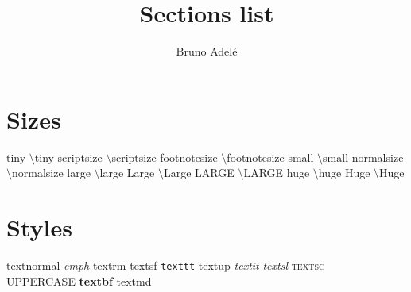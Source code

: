 \documentclass[a4paper, 12pt]{article}
\title{\Huge Sections list}
\author{Bruno Adelé}
\date{}
\newcommand{\showsize}[1]{\csname #1 \endcsname $\setminus$#1}
\begin{document}
\section{Sizes}
\noindent \showsize{tiny}
\showsize{scriptsize}
\showsize{footnotesize}
\showsize{small}
\showsize{normalsize}
\showsize{large}
\showsize{Large}
\showsize{LARGE}
\showsize{huge}
\showsize{Huge}

\section{Styles}
\noindent \textnormal{textnormal} \emph{emph} \textrm{textrm} \textsf{textsf} \texttt{texttt} \textup{textup} \textit{textit} \textsl{textsl} \textsc{textsc} \\
\uppercase{uppercase} \textbf{textbf} \textmd{textmd}
\end{document}
